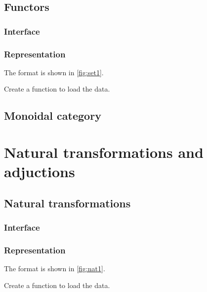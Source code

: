 \begin{exercise}
\section{Functors}

\subsection*{Interface}

\subsection*{Representation}
The format is shown in \cref{fig:set1}.




\begin{exercise}
Create a function to load the data.
%
\end{exercise}


\section{Monoidal category}


\chapter{Natural transformations and adjuctions}


\section{Natural transformations}

\subsection*{Interface}

\subsection*{Representation}
The format is shown in \cref{fig:nat1}.



\begin{exercise}
Create a function to load the data.

%
\end{exercise}



\end{exercise}

